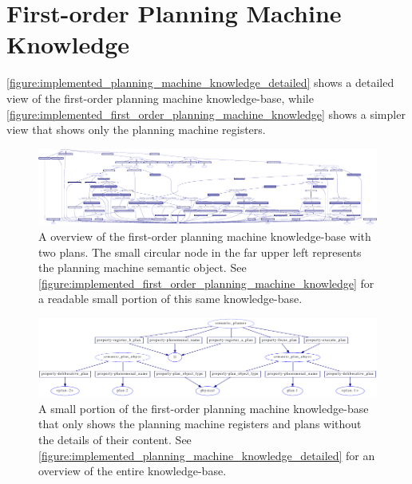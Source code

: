 \section{First-order Planning Machine Knowledge}

{\mbox{\autoref{figure:implemented_planning_machine_knowledge_detailed}}}
shows a detailed view of the first-order planning machine
knowledge-base, while
{\mbox{\autoref{figure:implemented_first_order_planning_machine_knowledge}}} shows
a simpler view that shows only the planning machine registers.
\begin{figure}
\begin{center}
\includegraphics[width=24cm]{gfx/implemented_planning_machine_knowledge_detailed}
\end{center}
\hspace{4cm}\parbox{15cm}{\caption[A overview of the first-order
    planning machine knowledge-base.]{A overview of the first-order
    planning machine knowledge-base with two plans.  The small
    circular node in the far upper left represents the planning
    machine semantic object.  See
    {\mbox{\autoref{figure:implemented_first_order_planning_machine_knowledge}}}
    for a readable small portion of this same
    knowledge-base.}\label{figure:implemented_planning_machine_knowledge_detailed}}
\end{figure}
\begin{figure}
\begin{center}
\includegraphics[width=14cm]{gfx/implemented_planning_machine_knowledge}
\end{center}
\caption[A small portion of the first-order planning machine
  knowledge-base.]{A small portion of the first-order planning machine
  knowledge-base that only shows the planning machine registers and
  plans without the details of their content.  See
  {\mbox{\autoref{figure:implemented_planning_machine_knowledge_detailed}}}
  for an overview of the entire knowledge-base.}
\label{figure:implemented_first_order_planning_machine_knowledge}
\end{figure}

